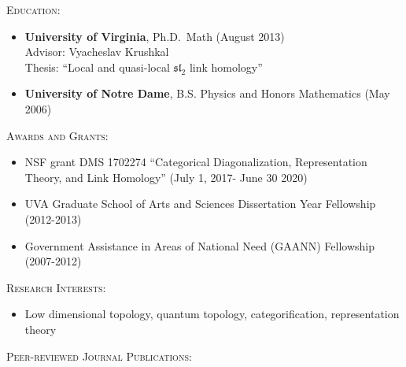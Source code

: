 \documentclass[12pt]{amsart}
\renewcommand{\j}{\indent}
\renewcommand{\v}{\vskip5pt }
\newcommand{\newitem}[1]{\noindent\textsc{#1:}\vskip5pt  }
\renewcommand{\sl}{\mathfrak{sl}}
\newcommand{\lm}{1em}
\newcommand{\ii}{0pt}
\begin{document}
%


\newitem{Education}
\begin{itemize}[leftmargin=\lm,itemindent=\ii]
\item[$\cdot$]\textbf{University of Virginia}, Ph.D.~Math (August 2013)\\ Advisor: Vyacheslav Krushkal\\
 Thesis: ``Local and quasi-local $\sl_2$ link homology''\v

\item[$\cdot$]\textbf{University of Notre Dame}, B.S. Physics and Honors Mathematics (May 2006) \v
\end{itemize}

\newitem{Awards and Grants}
\begin{itemize}[leftmargin=\lm,itemindent=\ii]
\item[$\cdot$] NSF grant DMS 1702274 ``Categorical Diagonalization, Representation Theory, and Link Homology'' (July 1, 2017- June 30 2020)\v

\item[$\cdot$] UVA Graduate School of Arts and Sciences Dissertation Year Fellowship (2012-2013)\v

\item[$\cdot$] Government Assistance in Areas of National Need (GAANN) Fellowship (2007-2012)\v
\end{itemize}


\newitem{Research Interests}
\begin{itemize}[leftmargin=\lm,itemindent=\ii]
\item[$\cdot$] Low dimensional topology, quantum topology, categorification, representation theory \v
\end{itemize}

\newitem{Peer-reviewed Journal Publications}
\end{document}
